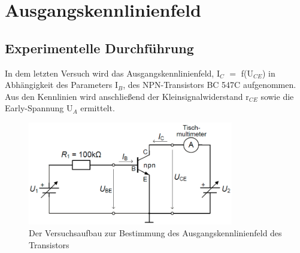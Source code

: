 \section{Ausgangskennlinienfeld}
\subsection{Experimentelle Durchf\"uhrung}
In dem letzten Versuch wird das Ausgangskennlinienfeld, I$_C$ $=$ f(U$_{CE}$) in Abh\"angigkeit des Parameters I$_B$, des NPN-Transistors BC 547C aufgenommen. Aus den Kennlinien wird anschlie\ss end der Kleinsignalwiderstand r$_{CE}$ sowie die Early-Spannung U$_A$ ermittelt.
\begin{figure}[!h]
\begin{center}
\includegraphics[width=0.8\textwidth]{ausgangsKennlinie}
\caption{Der Versuchsaufbau zur Bestimmung des Ausgangskennlinienfeld des Transistors}
\end{center}
\end{figure}
